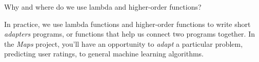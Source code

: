 \begin{blocksection}
\question Why and where do we use lambda and higher-order functions?

\begin{solution}[0.5in]
In practice, we use lambda functions and higher-order functions to write short \emph{adapters} programs, or functions that help us connect two programs together. In the \emph{Maps} project, you'll have an opportunity to \emph{adapt} a particular problem, predicting user ratings, to general machine learning algorithms.
\end{solution}
\end{blocksection}
